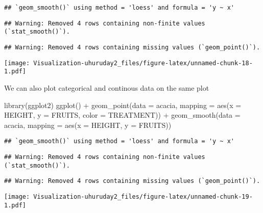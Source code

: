 \documentclass[
]{article}
\newenvironment{Shaded}{\begin{snugshade}}{\end{snugshade}}
\newcommand{\AttributeTok}[1]{\textcolor[rgb]{0.77,0.63,0.00}{#1}}
\newcommand{\FunctionTok}[1]{\textcolor[rgb]{0.00,0.00,0.00}{#1}}
\newcommand{\NormalTok}[1]{#1}
\newcommand{\SpecialCharTok}[1]{\textcolor[rgb]{0.00,0.00,0.00}{#1}}
\begin{document}
\begin{verbatim}
## `geom_smooth()` using method = 'loess' and formula = 'y ~ x'
\end{verbatim}

\begin{verbatim}
## Warning: Removed 4 rows containing non-finite values (`stat_smooth()`).
\end{verbatim}

\begin{verbatim}
## Warning: Removed 4 rows containing missing values (`geom_point()`).
\end{verbatim}

\texttt{[image: Visualization-uhuruday2\_files/figure-latex/unnamed-chunk-18-1.pdf]}

We can also plot categorical and continous data on the same plot

\begin{Shaded}
\begin{Highlighting}[]
\FunctionTok{library}\NormalTok{(ggplot2)}
\FunctionTok{ggplot}\NormalTok{() }\SpecialCharTok{+}
\FunctionTok{geom\_point}\NormalTok{(}\AttributeTok{data =}\NormalTok{ acacia,}
           \AttributeTok{mapping =} \FunctionTok{aes}\NormalTok{(}\AttributeTok{x =}\NormalTok{ HEIGHT, }\AttributeTok{y =}\NormalTok{ FRUITS,}
                         \AttributeTok{color =}\NormalTok{ TREATMENT)) }\SpecialCharTok{+}
\FunctionTok{geom\_smooth}\NormalTok{(}\AttributeTok{data =}\NormalTok{ acacia,}
            \AttributeTok{mapping =} \FunctionTok{aes}\NormalTok{(}\AttributeTok{x =}\NormalTok{ HEIGHT, }\AttributeTok{y =}\NormalTok{ FRUITS)) }
\end{Highlighting}
\end{Shaded}

\begin{verbatim}
## `geom_smooth()` using method = 'loess' and formula = 'y ~ x'
\end{verbatim}

\begin{verbatim}
## Warning: Removed 4 rows containing non-finite values (`stat_smooth()`).
\end{verbatim}

\begin{verbatim}
## Warning: Removed 4 rows containing missing values (`geom_point()`).
\end{verbatim}

\texttt{[image: Visualization-uhuruday2\_files/figure-latex/unnamed-chunk-19-1.pdf]}
\end{document}
